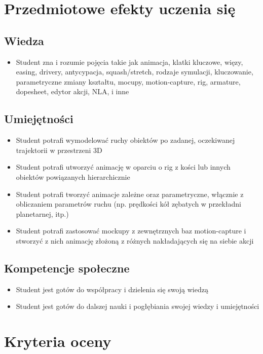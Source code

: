 \documentclass[12pt, a4paper]{article}
\begin{document}
\section{Przedmiotowe efekty uczenia się}

\subsection*{Wiedza}
\begin{itemize}
  \item Student zna i rozumie pojęcia takie jak animacja, klatki kluczowe, więzy, easing, drivery, antycypacja, squash/stretch, rodzaje symulacji, kluczowanie, parametryczne zmiany kształtu, mocupy, motion-capture, rig, armature, dopesheet, edytor akcji, NLA, i inne
\end{itemize}

\subsection*{Umiejętności}
\begin{itemize}
  \item Student potrafi wymodelować ruchy obiektów po zadanej, oczekiwanej trajektorii w przestrzeni 3D
  \item Student potrafi utworzyć animację w oparciu o rig z kości lub innych obiektów powiązanych hierarchicznie
  \item Student potrafi tworzyć animacje zależne oraz parametryczne, włącznie z obliczaniem parametrów ruchu (np. prędkości kół zębatych w przekładni planetarnej, itp.)
  \item Student potrafi zastosować mockupy z zewnętrznych baz motion-capture i stworzyć z nich animację złożoną z różnych nakładających się na siebie akcji
\end{itemize}

\subsection*{Kompetencje społeczne}
\begin{itemize}
  \item Student jest gotów do współpracy i dzielenia się swoją wiedzą
  \item Student jest gotów do dalszej nauki i pogłębiania swojej wiedzy i umiejętności
\end{itemize}

\section{Kryteria oceny}
\end{document}
